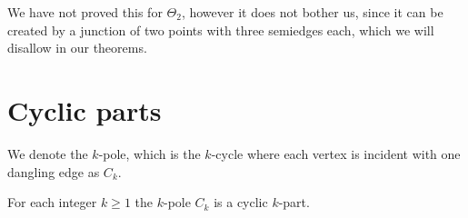 \documentclass[12pt, twoside]{book}
\begin{document}
We have not proved this for $\Theta_2$, however it does not bother us, since it can be created by a junction of two points with three semiedges each, which we will disallow in our theorems.

\section{Cyclic parts}\label{sec:cyclic-part-results}

We denote the $k$-pole, which is the $k$-cycle where each vertex is incident with one dangling edge as $C_k$.

\begin{lemma}\label{lem:each-cycle-cyclic-part}
	For each integer $k\geq 1$ the $k$-pole $C_k$ is a cyclic $k$-part. 
\end{lemma}
\end{document}
